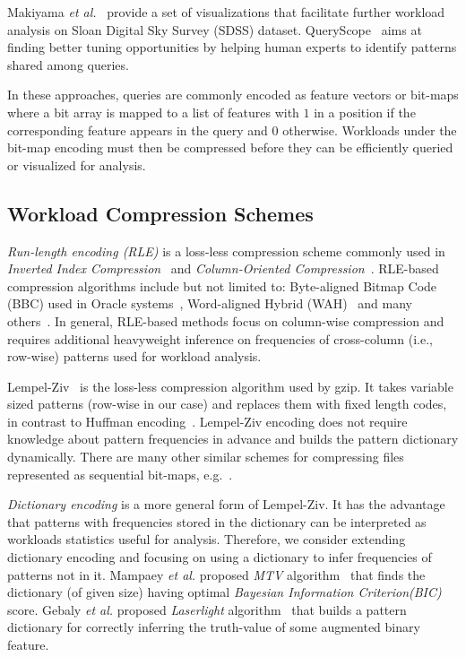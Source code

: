 Makiyama \textit{et al.}~\cite{DBLP:conf/simbig/MakiyamaRS15} provide a set of visualizations that facilitate further workload analysis on Sloan Digital Sky Survey (SDSS) dataset.
QueryScope~\cite{DBLP:journals/pvldb/HuRCLZ08} aims at finding better tuning opportunities by helping human experts to identify patterns shared among queries. 
%

In these approaches, queries are commonly encoded as feature vectors or bit-maps where a bit array is mapped to a list of features with $1$ in a position if the corresponding feature appears in the query and $0$ otherwise.
Workloads under the bit-map encoding must then be compressed before they can be efficiently queried or visualized for analysis. 
\subsection{Workload Compression Schemes}
\textit{Run-length encoding (RLE)} is a loss-less compression scheme commonly used in \textit{Inverted Index Compression}~\cite{DBLP:books/nostrand/WittenMT94,DBLP:journals/csur/ZobelM06} and \textit{Column-Oriented Compression}~\cite{DBLP:conf/sigmod/AbadiMF06}.
RLE-based compression algorithms include but not limited to: Byte-aligned Bitmap Code (BBC) used in Oracle systems~\cite{DBLP:journals/vldb/AntoshenkovZ96}, Word-aligned Hybrid (WAH)~\cite{DBLP:conf/ssdbm/WuOS02} and many others~\cite{DBLP:journals/acj/MoffatZ94,DBLP:conf/vldb/JohnsonA00,Antoshenkov:1995:BBC:874051.874730}.
In general, RLE-based methods focus on column-wise compression and requires additional heavyweight inference on frequencies of cross-column (i.e., row-wise) patterns used for workload analysis.

Lempel-Ziv~\cite{DBLP:journals/tit/ZivL77,DBLP:journals/tit/ZivL78} is the loss-less compression algorithm used by gzip.
It takes variable sized patterns (row-wise in our case) and replaces them with fixed length codes, in contrast to Huffman encoding~\cite{4051119}. 
Lempel-Ziv encoding does not require knowledge about pattern frequencies in advance and builds the pattern dictionary dynamically. 
There are many other similar schemes for compressing files represented as sequential bit-maps, e.g.~\cite{DBLP:conf/adbis/SkibinskiS07a}.

\textit{Dictionary encoding} is a more general form of Lempel-Ziv.
It has the advantage that patterns with frequencies stored in the dictionary can be interpreted as workloads statistics useful for analysis.
Therefore, we consider extending dictionary encoding and focusing on using a dictionary to infer frequencies of patterns not in it.
Mampaey \textit{et al.} proposed \textit{MTV} algorithm~\cite{DBLP:journals/tkdd/MampaeyVT12} that finds the dictionary (of given size) having optimal \textit{Bayesian Information Criterion(BIC)} score.
Gebaly \textit{et al.} proposed \textit{Laserlight} algorithm~\cite{DBLP:journals/pvldb/GebalyAGKS14} that builds a pattern dictionary for correctly inferring the truth-value of some augmented binary feature.

